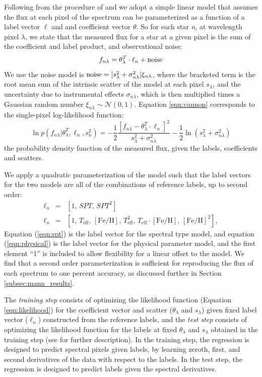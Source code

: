 \documentclass[modern]{aastex62}
\newcommand{\teff}{T_{\mathrm{eff}}}
\newcommand{\feh}{[{\mathrm{Fe}/\mathrm{H}}]}
\begin{document}
Following from the procedure of \citealt{Ness:2015} and \citealt{Ho:2017a} we adopt a simple linear model that assumes the flux at each pixel of the spectrum can be parameterized as a function of a label vector $\ell$ and and coefficient vector \emph{$\theta$}. So for each star \emph{n}, at wavelength pixel \emph{$\lambda$}, we state that the measured flux for a star at a given pixel is the sum of the coefficient and label product, and observational noise:
\begin{equation}
	f_{n\lambda} = \theta_{\lambda}^{T} \cdot \ell_{n} + {\rm noise} \label{eqn:cannon}
\end{equation} 
We use the noise model is ${\rm noise}=[s_{\lambda}^2 + \sigma_{n\lambda}^2]\xi_{n\lambda}$, where the bracketed term is the root mean sum of the intrinsic scatter of the model at each pixel \emph{$s_{\lambda}$}, and the uncertainty due to instrumental effects \emph{$\sigma_{n\lambda}$}, which is then multiplied times a Gaussian random number $\xi_{n\lambda} \sim \mathcal{N} (0,1)$. Equation \ref{eqn:cannon} corresponds to the single-pixel log-likelihood function:
\begin{equation}
	\ln p(f_{n\lambda}|\theta^T_{\lambda}, \ell_n, s^2_n) = 
	-\frac{1}{2}\frac{[f_{n\lambda} - \theta_{\lambda}^{T} \cdot \ell_{n}]^2}{s_{\lambda}^2 + \sigma_{n\lambda}^2} - \frac{1}{2} \ln(s_{\lambda}^2 + \sigma_{n\lambda}^2) 
	\label{eqn:likelihood}
\end{equation}
the probability density function of the measured flux, given the labels, coefficients and scatters.

We apply a quadratic parameterization of the model such that the label vectors for the two models are all of the combinations of reference labels, up to second order:
\begin{eqnarray}
\ell_{n} &=& [1, \, SPT, \, SPT^{2}] \label{eqn:spt}
\\
\ell_{n} &=& [1, \, \teff, \, \feh, \, \teff^2, \, \teff \cdot \feh, \, \feh^{2}] \label{eqn:physical}
,
\end{eqnarray}
Equation (\ref{eqn:spt}) is the label vector for the spectral type model, and equation (\ref{eqn:physical}) is the label vector for the physical parameter model, and the first element ``1'' is included to allow flexibility for a linear offset to the model. We find that a second order parameterization is sufficient for reproducing the flux of each spectrum to one percent accuracy, as discussed further in Section \ref{subsec:mann_results}.

The \emph{training step} consists of optimizing the likelihood function (Equation \ref{eqn:likelihood}) for the coefficient vector and scatter ($\theta_{\lambda}$ and $s_{\lambda}$) given fixed label vector (\emph{$\ell_n$}) constructed from the reference labels, and the \emph{test step} consists of optimizing the likelihood function for the labels at fixed $\theta_{\lambda}$ and $s_{\lambda}$ obtained in the training step (see \citealt{Ness:2015} for further description). 
In the training step, the regression is designed to predict spectral pixels
given labels, by learning zeroth, first, and second derivatives of the data with respect to
the labels. In the test step, the regression is designed to predict labels given the spectral
derivatives.
\end{document}
